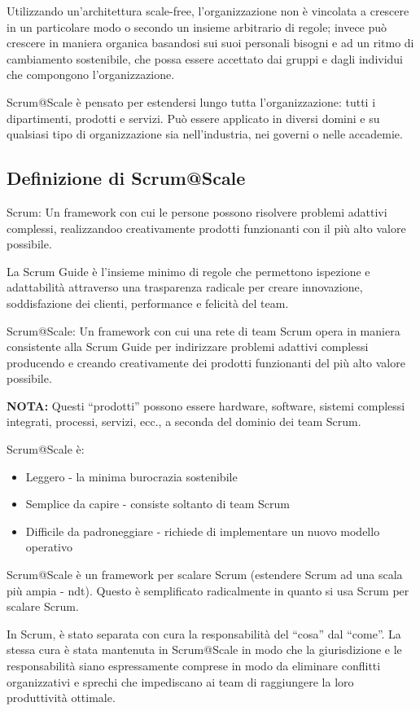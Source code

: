 \documentclass[12pt,a4paper,parskip=full]{scrartcl}
\begin{document}
Utilizzando un'architettura scale-free, l'organizzazione non è 
vincolata a crescere in un particolare modo o secondo un insieme arbitrario di
regole; invece può crescere in maniera organica basandosi sui suoi personali
bisogni e ad un ritmo di cambiamento sostenibile, che possa essere 
accettato dai gruppi e dagli individui che compongono l'organizzazione.

Scrum@Scale è pensato per estendersi lungo tutta l'organizzazione: tutti
i dipartimenti, prodotti e servizi. Può essere applicato in diversi domini
e su qualsiasi tipo di organizzazione sia nell'industria, nei governi o nelle accademie.

\subsection{Definizione di Scrum@Scale}
Scrum: Un framework con cui le persone possono risolvere problemi adattivi complessi,
realizzandoo creativamente prodotti funzionanti con il più alto valore possibile.

La Scrum Guide è l'insieme minimo di regole che permettono ispezione e adattabilità
attraverso una trasparenza radicale per creare innovazione, soddisfazione dei clienti,
performance e felicità del team.

Scrum@Scale: Un framework con cui una rete di team Scrum opera in maniera consistente
alla Scrum Guide per indirizzare problemi adattivi complessi producendo e creando creativamente dei prodotti funzionanti del più alto valore possibile.

\textbf{NOTA:} Questi ``prodotti'' possono essere hardware, software, sistemi complessi integrati, processi, servizi, ecc., a seconda del dominio dei team Scrum.

Scrum@Scale è:
\begin{itemize}
\item Leggero - la minima burocrazia sostenibile
\item Semplice da capire - consiste soltanto di team Scrum
\item Difficile da padroneggiare - richiede di implementare un nuovo modello operativo
\end{itemize}

Scrum@Scale è un framework per scalare Scrum (estendere Scrum ad una scala più ampia - ndt). Questo è semplificato radicalmente in quanto si usa Scrum per scalare Scrum.

In Scrum, è stato separata con cura la responsabilità del ``cosa'' dal ``come''.
La stessa cura è stata mantenuta in Scrum@Scale in modo che la giurisdizione e le responsabilità siano espressamente comprese in modo da eliminare conflitti organizzativi e sprechi che impediscano ai team di raggiungere la loro produttività ottimale.
\end{document}
